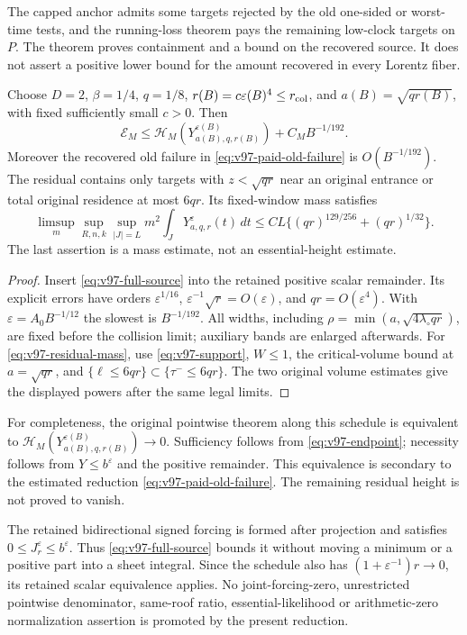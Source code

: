 The capped anchor admits some targets rejected by the old one-sided
or worst-time tests, and the running-loss theorem pays the remaining
low-clock targets on $P$. The theorem proves containment and a bound
on the recovered source. It does not assert a positive lower bound
for the amount recovered in every Lorentz fiber.

\begin{corollary}
\label{cor:v97-schedule}
Choose $D=2$, $\beta=1/4$, $q=1/8$,
$r(B)=c\varepsilon(B)^4\le r_{\rm col}$, and
$a(B)=\sqrt{q r(B)}$, with fixed sufficiently small $c>0$.
Then
\begin{equation}\label{eq:v97-endpoint}
 \mathcal E_M\le\mathcal H_M(Y_{a(B),q,r(B)}^{\varepsilon(B)})
                                      +C_MB^{-1/192}.
\end{equation}
Moreover the recovered old failure in \eqref{eq:v97-paid-old-failure}
is $O(B^{-1/192})$. The residual contains only targets with
$z<\sqrt{qr}$ near an original entrance or total original residence
at most $6qr$. Its fixed-window mass satisfies
\begin{equation}\label{eq:v97-residual-mass}
 \limsup_m\sup_{R,n,k}\sup_{|J|=L}m^2\int_JY_{a,q,r}^\varepsilon(t)\,dt
 \le C L\{(qr)^{129/256}+(qr)^{1/32}\}.
\end{equation}
The last assertion is a mass estimate, not an essential-height estimate.
\end{corollary}
\begin{proof}
Insert \eqref{eq:v97-full-source} into the retained positive scalar
remainder. Its explicit errors have orders
$\varepsilon^{1/16}$, $\varepsilon^{-1}\sqrt r=O(\varepsilon)$,
and $qr=O(\varepsilon^4)$. With $\varepsilon=A_0B^{-1/12}$ the
slowest is $B^{-1/192}$. All widths, including
$\rho=\min(a,\sqrt{4\lambda_\circ qr})$, are fixed before the
collision limit; auxiliary bands are enlarged afterwards.
For \eqref{eq:v97-residual-mass}, use \eqref{eq:v97-support},
$W\le1$, the critical-volume bound at $a=\sqrt{qr}$, and
$\{\ell\le6qr\}\subset\{\tau^-\le6qr\}$. The two original
volume estimates give the displayed powers after the same legal limits.
\end{proof}

For completeness, the original pointwise theorem along this schedule
is equivalent to $\mathcal H_M(Y_{a(B),q,r(B)}^{\varepsilon(B)})\to0$.
Sufficiency follows from \eqref{eq:v97-endpoint}; necessity follows
from $Y\le b^\varepsilon$ and the positive remainder. This equivalence
is secondary to the estimated reduction \eqref{eq:v97-paid-old-failure}.
The remaining residual height is not proved to vanish.

The retained bidirectional signed forcing is formed after projection
and satisfies $0\le J_r^\varepsilon\le b^\varepsilon$. Thus
\eqref{eq:v97-full-source} bounds it without moving a minimum or a
positive part into a sheet integral. Since the schedule also has
$(1+\varepsilon^{-1})r\to0$, its retained scalar equivalence applies.
No joint-forcing-zero, unrestricted pointwise denominator, same-roof
ratio, essential-likelihood or arithmetic-zero normalization assertion
is promoted by the present reduction.
